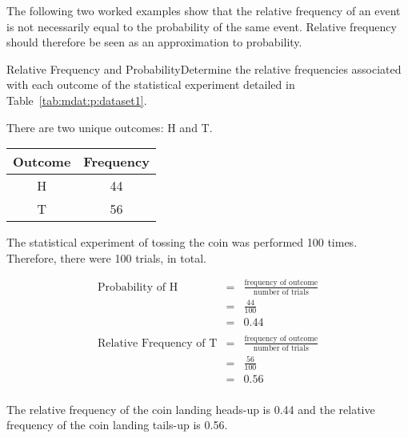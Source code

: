 \documentclass[10pt,a4paper,titlepage,twoside,openright]{report}
\begin{document}
The following two worked examples show that the relative frequency of an event is not necessarily equal to the probability of the same event. Relative frequency should therefore be seen as an approximation to probability.

\begin{wex}{Relative Frequency and Probability}{Determine the relative frequencies associated with each outcome of the statistical experiment detailed in Table~\ref{tab:mdat:p:dataset1}.}{
There are two unique outcomes: H and T.


\begin{center}
\begin{tabular}{|c|c|}\hline
Outcome & Frequency \\\hline\hline
H& 44\\\hline
T& 56\\\hline
\end{tabular}
\end{center}

The statistical experiment of tossing the coin was performed 100 times. Therefore, there were 100 trials, in total.

\begin{eqnarray*}
\mbox{Probability of H} &=& \frac{\mbox{frequency of outcome}}{\mbox{number of trials}}\\
&=&\frac{44}{100}\\
&=&0.44\\
\\
\mbox{Relative Frequency of T} &=& \frac{\mbox{frequency of outcome}}{\mbox{number of trials}}\\
&=&\frac{56}{100}\\
&=&0.56\\
\end{eqnarray*}

The relative frequency of the coin landing heads-up is 0.44 and the relative frequency of the coin landing tails-up is 0.56.}
\end{wex}
\end{document}
